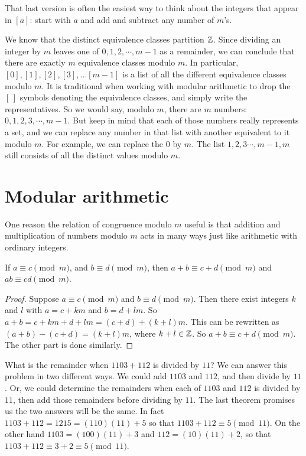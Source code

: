 That last version is often the easiest way to think about the integers that
appear in $[a]$: start with $a$ and add and subtract any number of $m$'s.


We know that the distinct equivalence classes partition $\mathbb{Z}$.
Since dividing an integer by $m$ leaves one of $0,1,2,\cdots,m-1$ as a remainder,
we can conclude that there are exactly $m$ equivalence classes modulo $m$.
In particular,  $[0],[1],[2],[3],...[m-1]$ is a list of all the different
equivalence classes modulo $m$. It is traditional\marginnote{\dbend} when working with modular
arithmetic to drop the $[\,]$ symbols denoting the equivalence classes, and simply
write the representatives. So we would say, modulo $m$, there are $m$ numbers:
$0,1,2,3,\cdots, m-1$. But keep in mind that each of those numbers really
represents a set, and we can replace any number in that list with another
equivalent to it modulo $m$. For example, we can replace the $0$ by $m$.
The list $1,2,3\cdots, m-1,m$ still consists of all the distinct values modulo $m$.


\section{Modular arithmetic}
One reason the relation of congruence modulo $m$ useful is that addition
and multiplication of numbers modulo $m$ acts in many ways just like arithmetic
with ordinary integers.

\begin{thm}
 If 
 $a\equiv c\pmod m$, and $b\equiv d\pmod m$,
 then $a+b\equiv c+d\pmod m$ and $ab\equiv cd\pmod m$.
\end{thm}
\begin{proof}
Suppose $a\equiv c\pmod m$ and $b\equiv d\pmod m$. 
Then there exist integers $k$ and $l$
with $a=c+km$ and $b=d+lm$. So 
$a+b=c+km+d+lm=(c+d)+(k+l)m$. This can be rewritten as $(a+b)-(c+d)=(k+l)m$, 
where $k+l\in \mathbb{Z}$.
So $a+b\equiv c+d\pmod m$. The other part is done  similarly.
\end{proof}

\begin{exmp}
What is the remainder when $1103+112$ is divided by $11$?
We can answer this problem in two different ways. We could add $1103$ and $112$,
and then divide by $11$. Or, we could determine the remainders when each of $1103$ and
$112$ is divided by $11$, then add those remainders before dividing by $11$. 
The last theorem promises us the
two answers will be the same. In fact $1103+112 = 1215 = (110)(11) + 5$ 
so that $1103+112\equiv 5 \pmod{11}$. On the other hand
$1103 = (100)(11)+3$ and $112 = (10)(11)+2$, so that
$1103+112\equiv 3+2\equiv 5 \pmod{11}$. 
\end{exmp}

